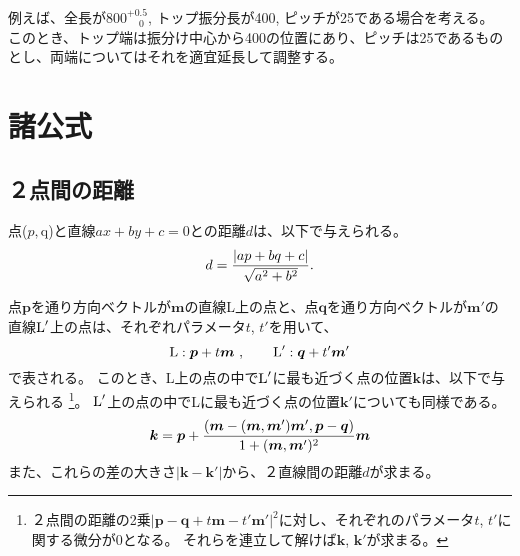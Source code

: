 例えば、全長が$800^{+0.5}_{\phantom -0}$, トップ振分長が400, ピッチが25である場合を考える。
このとき、トップ端は振分け中心から400の位置にあり、ピッチは25であるものとし、両端についてはそれを適宜延長して調整する。




\chapter{諸公式}




\section{２点間の距離}
\begin{tcolorbox}
点($p, $q)と直線$ax+by+c=0$との距離$d$は、以下で与えられる。
\begin{equation}
  \notag
  d = \frac{|ap+bq+c|}{\sqrt{a^2+b^2}}.
\end{equation}
\end{tcolorbox}
\begin{tcolorbox}
点$\boldsymbol p$を通り方向ベクトルが$\boldsymbol m$の直線L上の点と、点$\boldsymbol q$を通り方向ベクトルが$\boldsymbol m'$の直線$\text L'$上の点は、それぞれパラメータ$t$, $t'$を用いて、
\begin{equation}
  \notag
  \text L: \boldsymbol p+t\boldsymbol m\ , \qquad
  \text L': \boldsymbol q+t'\boldsymbol m'
\end{equation}
で表される。
このとき、L上の点の中で$\text L'$に最も近づく点の位置$\boldsymbol k$は、以下で与えられる
\footnote{２点間の距離の2乗$|\boldsymbol p-\boldsymbol q+t\boldsymbol m-t'\boldsymbol m'|^2$に対し、それぞれのパラメータ$t$, $t'$に関する微分が0となる。
それらを連立して解けば$\boldsymbol k$, $\boldsymbol k'$が求まる。}。
$\text L'$上の点の中でLに最も近づく点の位置$\boldsymbol k'$についても同様である。
\begin{equation}
  \notag
  \boldsymbol k
  = \boldsymbol p
    +\frac{(\boldsymbol m-(\boldsymbol m, \boldsymbol m')\boldsymbol m', \boldsymbol p-\boldsymbol q)}
          {1+(\boldsymbol m, \boldsymbol m')^2}\boldsymbol m
\end{equation}
また、これらの差の大きさ$|\boldsymbol k-\boldsymbol k'|$から、２直線間の距離$d$が求まる。
\end{tcolorbox}





